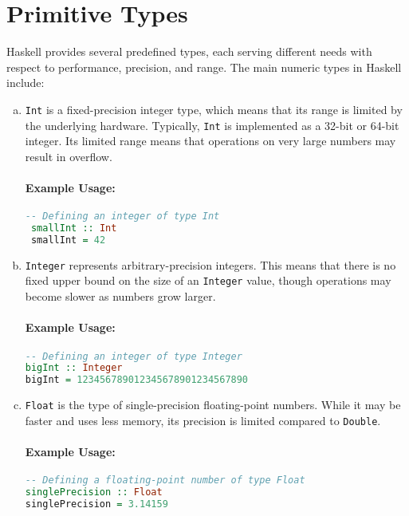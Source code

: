 \section{Primitive Types}
Haskell provides several predefined types, each serving different needs with respect to performance, precision,
and range. The main numeric types in Haskell include: 
\begin{enumerate}[(a)]
\item \texttt{Int} is a fixed-precision integer type, which means that its range is limited by the underlying
      hardware. Typically, \texttt{Int} is implemented as a 32-bit or 64-bit integer. Its limited range means that
      operations on very large numbers may result in overflow. 

      \paragraph{Example Usage:}
      \begin{lstlisting}[style=haskellstyle, language=Haskell]
 -- Defining an integer of type Int
 smallInt :: Int
 smallInt = 42
      \end{lstlisting}

\item \texttt{Integer} represents arbitrary-precision integers. This means that there is no fixed upper bound
      on the size of an \texttt{Integer} value, though operations may become slower as numbers grow larger. 

\paragraph{Example Usage:}
\begin{lstlisting}[style=haskellstyle, language=Haskell]
-- Defining an integer of type Integer
bigInt :: Integer
bigInt = 123456789012345678901234567890
\end{lstlisting}

\item \texttt{Float} is the type of single-precision floating-point numbers. While it may be faster and uses less
      memory, its precision is limited compared to \texttt{Double}. 

\paragraph{Example Usage:}
\begin{lstlisting}[style=haskellstyle, language=Haskell]
-- Defining a floating-point number of type Float
singlePrecision :: Float
singlePrecision = 3.14159
\end{lstlisting}


\end{enumerate}

